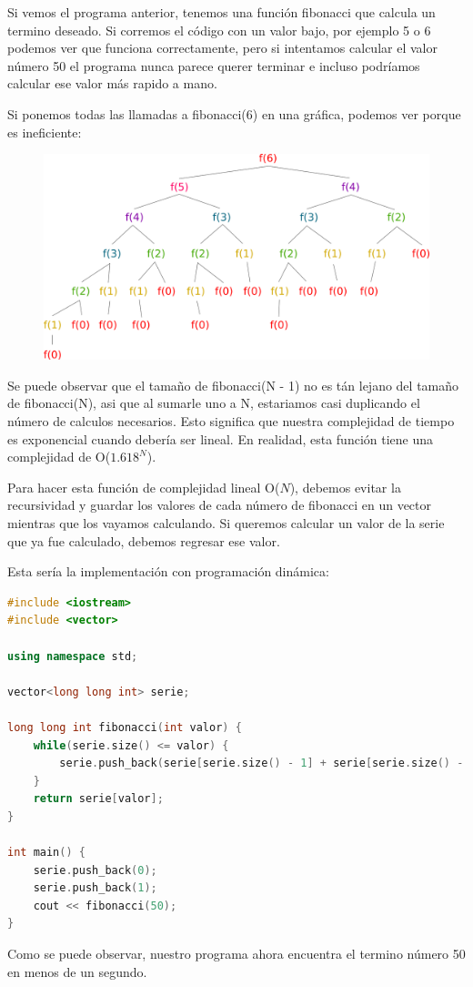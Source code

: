 \documentclass{article}
\begin{document}
Si vemos el programa anterior, tenemos una función fibonacci que calcula un termino deseado. Si corremos el código con un valor bajo, por ejemplo 5 o 6 podemos ver que funciona correctamente, pero si intentamos calcular el valor número 50 el programa nunca parece querer terminar e incluso podríamos calcular ese valor más rapido a mano.

Si ponemos todas las llamadas a fibonacci(6) en una gráfica, podemos ver porque es ineficiente:

\begin{figure}[H]
    \centering
    \includegraphics[width=0.4\paperwidth]{fibonacci}
\end{figure}

Se puede observar que el tamaño de fibonacci(N - 1) no es tán lejano del tamaño de fibonacci(N), asi que al sumarle uno a N, estariamos casi duplicando el número de calculos necesarios. Esto significa que nuestra complejidad de tiempo es exponencial cuando debería ser lineal. En realidad, esta función tiene una complejidad de O($1.618^N$).

Para hacer esta función de complejidad lineal O($N$), debemos evitar la recursividad y guardar los valores de cada número de fibonacci en un vector mientras que los vayamos calculando. Si queremos calcular un valor de la serie que ya fue calculado, debemos regresar ese valor.

Esta sería la implementación con programación dinámica:

\begin{lstlisting}[language=C++, caption=Programación dinámica]
#include <iostream>
#include <vector>

using namespace std;

vector<long long int> serie;

long long int fibonacci(int valor) {
    while(serie.size() <= valor) {
        serie.push_back(serie[serie.size() - 1] + serie[serie.size() - 2]);
    }
    return serie[valor];
}

int main() {
    serie.push_back(0);
    serie.push_back(1);
    cout << fibonacci(50);
}
\end{lstlisting}

Como se puede observar, nuestro programa ahora encuentra el termino número 50 en menos de un segundo.
\end{document}
